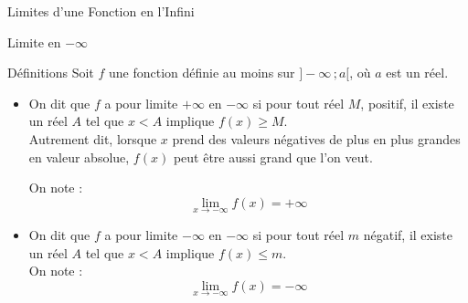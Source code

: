\documentclass{coursbook}
\begin{document}
\begin{Gpartie}{Limites d'une Fonction en l'Infini}
        \begin{Spartie}{Limite en $-\infty$} 
            \begin{SSpartie}{Définitions}
                Soit $f$ une fonction définie au moins sur $\big]-\infty\,;a\big[$, où $a$ est un réel.
                \begin{itemize}
                    \item   On dit que $f$ a pour limite $+\infty$ en $-\infty$ si pour tout réel $M$, positif, il existe un réel $A$ tel que $x<A$ implique $f(x)\geq M$. \\ Autrement dit, lorsque $x$ prend des valeurs négatives de plus en plus grandes en valeur absolue, $f(x)$ peut être aussi grand que l'on veut.
                    
                    On note : \[\boxed{\lim\limits_{x\to-\infty}f(x)=+\infty}\]
                    \begin{center}
                        \parbox{\linewidth}{}
                    \end{center}
                    \vfill
                    \pagebreak
                    \item   On dit que $f$ a pour limite $-\infty$ en $-\infty$ si pour tout réel $m$ négatif, il existe un réel $A$ tel que $x<A$ implique $f(x)\leq m$. \\ On note : \[\boxed{\lim\limits_{x\to-\infty}f(x)=-\infty}\]
                    \begin{center}

\end{center}
\end{itemize}
\end{SSpartie}
\end{Spartie}
\end{Gpartie}
\end{document}
